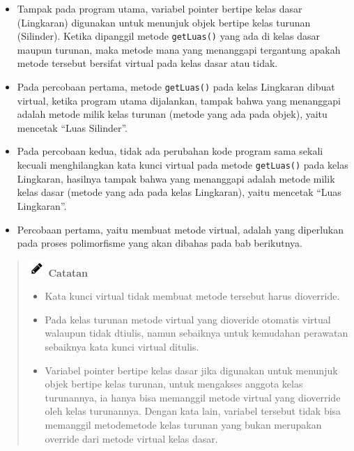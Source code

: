 \begin{itemize}

\item
  Tampak pada program utama, variabel pointer bertipe kelas dasar
  (Lingkaran) digunakan untuk menunjuk objek bertipe kelas turunan
  (Silinder). Ketika dipanggil metode \texttt{getLuas()} yang ada di
  kelas dasar maupun turunan, maka metode mana yang menanggapi
  tergantung apakah metode tersebut bersifat virtual pada kelas dasar
  atau tidak.
\item
  Pada percobaan pertama, metode \texttt{getLuas()} pada kelas Lingkaran
  dibuat virtual, ketika program utama dijalankan, tampak bahwa yang
  menanggapi adalah metode milik kelas turunan (metode yang ada pada
  objek), yaitu mencetak ``Luas Silinder''.
\item
  Pada percobaan kedua, tidak ada perubahan kode program sama sekali
  kecuali menghilangkan kata kunci virtual pada metode
  \texttt{getLuas()} pada kelas Lingkaran, hasilnya tampak bahwa yang
  menanggapi adalah metode milik kelas dasar (metode yang ada pada kelas
  Lingkaran), yaitu mencetak ``Luas Lingkaran''.
\item
  Percobaan pertama, yaitu membuat metode virtual, adalah yang
  diperlukan pada proses polimorfisme yang akan dibahas pada bab
  berikutnya.
\end{itemize}
\begin{quotation}
\includegraphics{images/pencil}	\textbf{Catatan} 
	\begin{itemize}
		\item Kata
		kunci virtual tidak membuat metode tersebut harus dioverride.
		\item Pada kelas turunan metode virtual yang dioveride
		otomatis virtual walaupun tidak dtiulis, namun sebaiknya untuk kemudahan
		perawatan sebaiknya kata kunci virtual ditulis.
		\item Variabel pointer bertipe kelas dasar jika digunakan untuk menunjuk objek
		bertipe kelas turunan, untuk mengakses anggota kelas turunannya, ia
		hanya bisa memanggil metode virtual yang dioverride oleh kelas
		turunannya. Dengan kata lain, variabel tersebut tidak bisa memanggil
		metodemetode kelas turunan yang bukan merupakan override dari metode
		virtual kelas dasar.
	\end{itemize}
\end{quotation}
 

